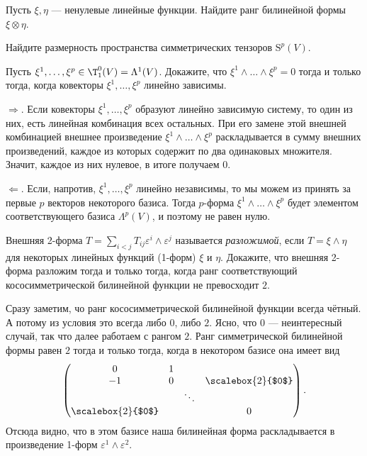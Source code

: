 \begin{problem}
    Пусть $\xi, \eta$ --- ненулевые линейные функции. Найдите ранг билинейной формы $\xi \otimes \eta$.
\end{problem}

\begin{problem}
    Найдите размерность пространства симметрических тензоров $\mathrm{S}^p(V)$.
\end{problem}

\begin{problem}
    Пусть $\xi^1, \ldots, \xi^p \in \T_1^0(V) = \Lambda^1(V)$. Докажите, что $\xi^1 \wedge \ldots \wedge \xi^p = 0$ тогда и только тогда, когда ковекторы $\xi^1, \ldots, \xi^p$ линейно зависимы.
\end{problem}

\begin{solution}
    $\Rightarrow$. Если ковекторы $\xi^1, \ldots, \xi^p$ образуют линейно зависимую систему, то один из них, есть линейная комбинация всех остальных. При его замене этой внешней комбинацией внешнее произведение $\xi^1 \wedge \ldots \wedge \xi^p$ раскладывается в сумму внешних произведений, каждое из которых содержит по два одинаковых множителя. Значит, каждое из них нулевое, в итоге получаем $0$.

    $\Leftarrow$. Если, напротив, $\xi^1, \ldots, \xi^p$ линейно независимы, то мы можем из принять за первые $p$ векторов некоторого базиса. Тогда $p$-форма $\xi^1 \wedge \ldots \wedge \xi^p$ будет элементом соответствующего базиса $\Lambda^p(V)$, и поэтому не равен нулю.
\end{solution}

\begin{problem}
    Внешняя 2-форма $T = \sum\limits_{i < j}T_{ij}\varepsilon^i \wedge \varepsilon^j$ называется \textit{разложимой}, если $T = \xi \wedge \eta$ для некоторых линейных функций (1-форм) $\xi$ и $\eta$. Докажите, что внешняя 2-форма разложим тогда и только тогда, когда ранг соответствующий кососимметрической билинейной функции не превосходит $2$.
\end{problem}

\begin{solution}
    Сразу заметим, чо ранг кососимметрической билинейной функции всегда чётный. А потому из условия это всегда либо $0$, либо $2$. Ясно, что $0$ --- неинтересный случай, так что далее работаем с рангом $2$. Ранг симметрической билинейной формы равен $2$ тогда и только тогда, когда в некотором базисе она имеет вид
    \[
        \begin{pmatrix}
            0 & 1 & & \\
            -1 & 0 & & \scalebox{2}{$0$} \\
             & & \ddots & \\
             \scalebox{2}{$0$} & & & 0
        \end{pmatrix}.
    \]
    Отсюда видно, что в этом базисе наша билинейная форма раскладывается в произведение 1-форм $\varepsilon^1 \wedge \varepsilon^2$.
\end{solution}

